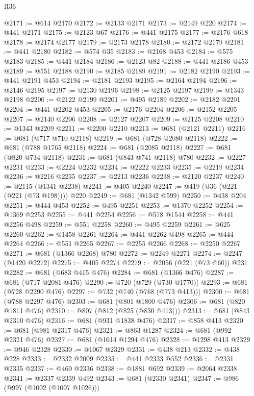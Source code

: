 \begin{lexlean}{R36}
\begin{coremodule}
@2171 := @614 @2170
@2172 := @2133 @2171
@2173 := @2149 @220
@2174 := @441 @2171
@2175 := @2123 @67
@2176 := @441 @2175
@2177 := @2176 @618
@2178 := @2174 @2177
@2179 := @2173 @2178
@2180 := @2172 @2179
@2181 := @441 @2180
@2182 := @574 @35
@2183 := @2168 @453
@2184 := @575 @2183
@2185 := @441 @2184
@2186 := @2123 @82
@2188 := @441 @2186 @453
@2189 := @551 @2188
@2190 := @2185 @2189
@2191 := @2182 @2190
@2193 := @441 @2191 @453
@2194 := @2181 @2193
@2195 := @2164 @2194
@2196 := @2146 @2195
@2197 := @2130 @2196
@2198 := @2125 @2197
@2199 := @1343 @2198
@2200 := @2122 @2199
@2201 := @495 @2189
@2202 := @2182 @2201
@2204 := @441 @2202 @453
@2205 := @2176 @2204
@2206 := @2152 @2205
@2207 := @2140 @2206
@2208 := @2127 @2207
@2209 := @2125 @2208
@2210 := @1343 @2209
@2211 := @2200 @2210
@2213 := @681 (@2121 @2211)
@2216 := @681 (@717 @710 @2118)
@2219 := @681 (@728 @2080 @2118)
@2222 := @681 (@788 @1765 @2118)
@2224 := @681 (@2085 @2118)
@2227 := @681 (@820 @734 @2118)
@2231 := @681 (@843 @741 @2118) @780
@2232 := @2227 @2231
@2233 := @2224 @2232
@2234 := @2222 @2233
@2235 := @2219 @2234
@2236 := @2216 @2235
@2237 := @2213 @2236
@2238 := @2120 @2237
@2240 := @2115 (@1341 @2238)
@2241 := @405 @2240
@2247 := @419 (@36 (@221 (@221 (@73 @198)))) @220
@2249 := @681 (@1342 @599)
@2250 := @438 @204
@2251 := @444 @453
@2252 := @495 @2251
@2253 := @1370 @2252
@2254 := @1369 @2253
@2255 := @441 @2254
@2256 := @578 @1544
@2258 := @441 @2256 @498
@2259 := @551 @2258
@2260 := @495 @2259
@2261 := @625 @2260
@2262 := @1458 @2261
@2264 := @441 @2262 @498
@2265 := @444 @2264
@2266 := @551 @2265
@2267 := @2255 @2266
@2268 := @2250 @2267
@2271 := @681 (@1366 @2268) @780
@2272 := @2249 @2271
@2274 := @2247 (@1420 @2272)
@2275 := @405 @2274
@2279 := @2056 (@221 (@73 @60)) @231
@2282 := @681 (@683 @415 @476)
@2284 := @681 (@1366 @476)
@2287 := @681 (@717 @2081 @476)
@2290 := @720 (@729 (@730 @1770))
@2293 := @681 (@728 @2290 @476)
@2297 := @732 (@740 (@768 (@773 @413)))
@2300 := @681 (@788 @2297 @476)
@2303 := @681 (@801 @1800 @476)
@2306 := @681 (@820 @1811 @476)
@2310 := @807 (@812 (@825 (@830 @413)))
@2313 := @681 (@843 @2310 @476)
@2316 := @681 (@931 @1838 @476)
@2317 := @858 @413
@2320 := @681 (@981 @2317 @476)
@2321 := @863 @1287
@2324 := @681 (@992 @2321 @476)
@2327 := @681 (@1014 @1294 @476)
@2328 := @1298 @413
@2329 := @946 @2328
@2330 := @1067 @2329
@2331 := @438 @213
@2332 := @438 @228
@2333 := @2332 @2009
@2335 := @441 @2333 @552
@2336 := @2331 @2335
@2337 := @460 @2336
@2338 := @1881 @692
@2339 := @2064 @2338
@2341 := @2337 @2339 @492
@2343 := @681 (@2330 @2341)
@2347 := @986 (@997 (@1002 (@1007 @1026)))

\end{coremodule}
\end{lexlean}
